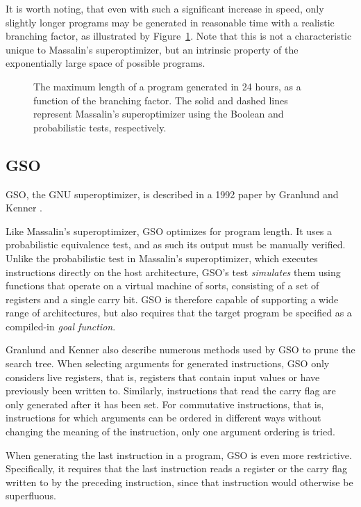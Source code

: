 \documentclass[a4paper,11pt]{kth-mag}
\begin{document}
It is worth noting, that even with such a significant increase in speed, only slightly longer programs may be generated in reasonable time with a realistic branching factor, as illustrated by Figure~\ref{fig:so_program_length}.
Note that this is not a characteristic unique to Massalin's superoptimizer, but an intrinsic property of the exponentially large space of possible programs.

\begin{figure}
\centering

\caption{The maximum length of a program generated in 24 hours, as a function of the branching factor.
The solid and dashed lines represent Massalin's superoptimizer using the Boolean and probabilistic tests, respectively.}
\label{fig:so_program_length}
\end{figure}

\subsection{GSO}

GSO, the GNU superoptimizer, is described in a 1992 paper by Granlund and Kenner \cite{granlund92}.

Like Massalin's superoptimizer, GSO optimizes for program length.
It uses a probabilistic equivalence test, and as such its output must be manually verified.
Unlike the probabilistic test in Massalin's superoptimizer, which executes instructions directly on the host architecture, GSO's test \emph{simulates} them using functions that operate on a virtual machine of sorts, consisting of a set of registers and a single carry bit.
GSO is therefore capable of supporting a wide range of architectures, but also requires that the target program be specified as a compiled-in \emph{goal function}.

Granlund and Kenner also describe numerous methods used by GSO to prune the search tree.
When selecting arguments for generated instructions, GSO only considers live registers, that is, registers that contain input values or have previously been written to.
Similarly, instructions that read the carry flag are only generated after it has been set.
For commutative instructions, that is, instructions for which arguments can be ordered in different ways without changing the meaning of the instruction, only one argument ordering is tried.

When generating the last instruction in a program, GSO is even more restrictive.
Specifically, it requires that the last instruction reads a register or the carry flag written to by the preceding instruction, since that instruction would otherwise be superfluous.
\end{document}
